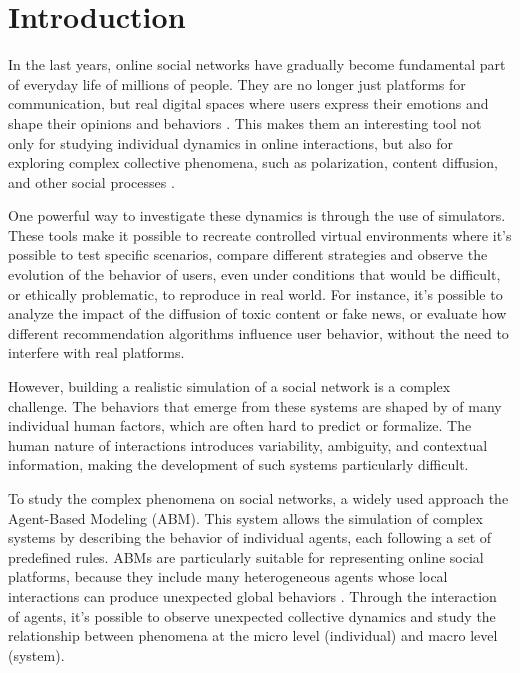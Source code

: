 \section{Introduction}
\label{sec:introduction}

In the last years, online social networks have gradually become fundamental part of everyday life of millions of people.
They are no longer just platforms for communication, but real digital spaces where users express their emotions and shape their opinions and behaviors \cite{bakshy2015}.
This makes them an interesting tool not only for studying individual dynamics in online interactions, but also for exploring complex collective phenomena, such as polarization, content diffusion, and other social processes \cite{vosoughi2018spread}.

\medskip
One powerful way to investigate these dynamics is through the use of simulators.
These tools make it possible to recreate controlled virtual environments where it's possible to test specific scenarios, compare different strategies and observe the evolution of the behavior of users, even under conditions that would be difficult, or ethically problematic, to reproduce in real world.
For instance, it's possible to analyze the impact of the diffusion of toxic content or fake news, or evaluate how different recommendation algorithms influence user behavior, without the need to interfere with real platforms.

However, building a realistic simulation of a social network is a complex challenge.
The behaviors that emerge from these systems are shaped by of many individual human factors, which are often hard to predict or formalize.
The human nature of interactions introduces variability, ambiguity, and contextual information, making the development of such systems particularly difficult.


\medskip
To study the complex phenomena on social networks, a widely used approach the Agent-Based Modeling (ABM).
This system allows the simulation of complex systems by describing the behavior of individual agents, each following a set of predefined rules.
ABMs are particularly suitable for representing online social platforms, because they include many heterogeneous agents whose local interactions can produce unexpected global behaviors \cite{gausen2021can}.
Through the interaction of agents, it's possible to observe unexpected collective dynamics and study the relationship between phenomena at the micro level (individual) and macro level (system).

